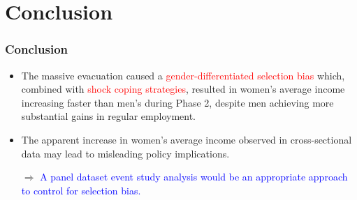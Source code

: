 \documentclass[serif, aspectratio=169]{beamer}
\begin{document}
\section{Conclusion}

\begin{frame}[label=summary]
\frametitle{Conclusion}







{\Large
\begin{itemize}

\item The massive evacuation caused a \textcolor{red}{gender-differentiated selection bias} which, combined with \textcolor{red}{shock coping strategies}, resulted in women's average income increasing faster than men's during Phase 2, despite men achieving more substantial gains in regular employment.

\item The apparent increase in women's average income observed in cross-sectional data may lead to misleading policy implications.

  \vspace{0.3cm}
  \hspace{1cm} $\Rightarrow$ \textcolor{blue}{A panel dataset event study analysis would be an appropriate approach to control for selection bias.}
\end{itemize}
}
\end{frame}
\end{document}
